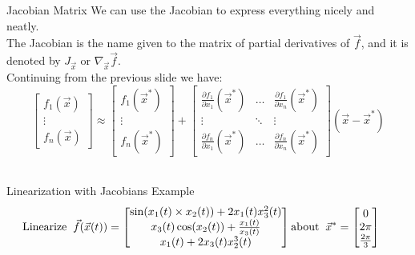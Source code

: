 \begin{frame}{Jacobian Matrix}
We can use the Jacobian to express everything nicely and neatly. \\
The Jacobian is the name given to the matrix of partial derivatives of $\vec{f}$, and it is denoted by $J_{\vec{x}}$ or $\nabla_{\vec{x}}\vec{f}$. \\ \pause
Continuing from the previous slide we have: \\
\[
\begin{bmatrix} f_1(\vec{x}) \\ \vdots \\f_n(\vec{x}) \end{bmatrix} \approx 
\begin{bmatrix} f_1(\vec{x}^*) \\ \vdots \\f_n(\vec{x}^*) \end{bmatrix} + 
\begin{bmatrix} \frac{\partial f_1}{\partial x_1}(\vec{x}^*)& \hdots& \frac{\partial f_1}{\partial x_n}(\vec{x}^*) \\ \vdots & \ddots &\vdots \\ \frac{\partial f_n}{\partial x_1}(\vec{x}^*)& \hdots &  \frac{\partial f_n}{\partial x_n}(\vec{x}^*) \end{bmatrix}
(\vec{x} - \vec{x}^*)
\]
\\

\end{frame}

\begin{frame}{Linearization with Jacobians Example}
\begin{align*}
    \text{\hspace{-3ex}Linearize}  \hspace{0.2 cm} 
\vec{f}(\vec{x}(t))  = 
\begin{bmatrix}
\sin(x_1(t)\times x_2(t)) + 2x_1(t)x_3^2(t)\\
x_3(t)\cos(x_2(t)) + \frac{x_1(t)}{x_3(t)}\\
x_1(t) + 2x_3(t)x_2^3(t)
\end{bmatrix} 
\text{about} \hspace{0.2 cm} \vec{x}^* = \begin{bmatrix}
0\\ 2 \pi \\ \frac{2 \pi}{3}
\end{bmatrix} 
\end{align*}
\end{frame}

